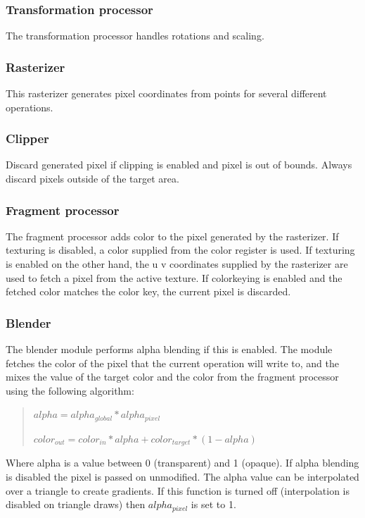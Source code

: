 \documentclass[10pt,a4paper]{article}
\begin{document}
\subsubsection{Transformation processor}
The transformation processor handles rotations and scaling.

\subsubsection{Rasterizer}
This rasterizer generates pixel coordinates from points for several different operations.

\subsubsection{Clipper}
Discard generated pixel if clipping is enabled and pixel is out of bounds. Always discard pixels outside of the target area.

\subsubsection{Fragment processor}
The fragment processor adds color to the pixel generated by the rasterizer. If texturing is disabled, a color supplied from the color register is used. If texturing is enabled on the other hand, the u v coordinates supplied by the rasterizer are used to fetch a pixel from the active texture. If colorkeying is enabled and the fetched color matches the color key, the current pixel is discarded.

\subsubsection{Blender}
The blender module performs alpha blending if this is enabled. The module fetches the color of the pixel that the current operation will write to, and the mixes the value of the target color and the color from the fragment processor using the following algorithm:

\begin{quote}
$ alpha = alpha_{global} * alpha_{pixel} $

$ color_{out} = color_{in} * alpha + color_{target} * (1 - alpha) $
\end{quote}

Where alpha is a value between 0 (transparent) and 1 (opaque). If alpha blending is disabled the pixel is passed on unmodified. The alpha value can be interpolated over a triangle to create gradients. If this function is turned off (interpolation is disabled on triangle draws) then $alpha_{pixel}$ is set to 1.
\end{document}
